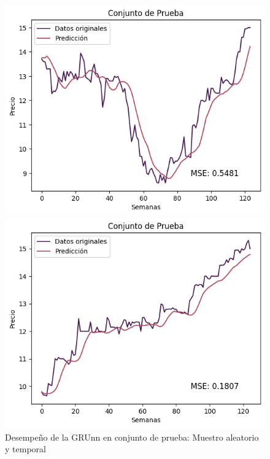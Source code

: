 \begin{figure}[H]
    \begin{minipage}{0.5\textwidth}
        \centering
        \includegraphics[width=\linewidth]{Figuras/proceso_de_entrenamiento/grafs_c_prueba/muestreo_aleatorio/GRU/estandar/GRU.png}
    \end{minipage}
    \begin{minipage}{0.5\textwidth}
        \centering
        \includegraphics[width=\linewidth]{Figuras/proceso_de_entrenamiento/grafs_c_prueba/GRU/estandar/GRU.png}
    \end{minipage}
    \caption{Desempeño de la GRUnn en conjunto de prueba: Muestro aleatorio y temporal} 
    \label{fig:c_prueba_GRU}
\end{figure}

